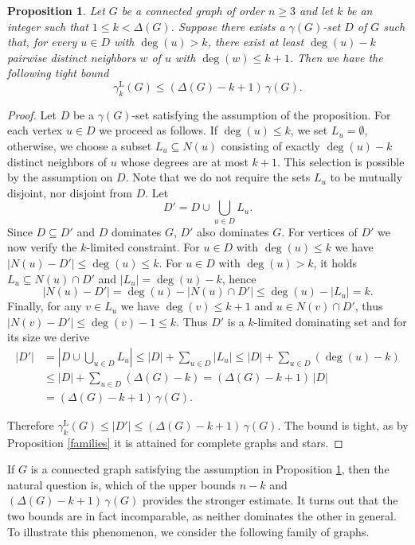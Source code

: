 \documentclass[11pt]{article}
\newtheorem{proposition}[theorem]{Proposition}
\newcommand{\gammakL}{\gamma_k^{\mathrm L}}
\begin{document}
\begin{proposition}
\label{Delta-v-zg}
Let $G$ be a connected graph of order $n\geq 3$ and let $k$ be an integer such that $1 \le k < \Delta(G)$. 
Suppose there exists a $\gamma(G)$-set $D$ of $G$ such that, for every $u\in D$ with $\deg(u)>k$, 
there exist at least $\deg(u)-k$ pairwise distinct neighbors $w$ of $u$ with $\deg(w)\le k+1$. Then we have the following tight bound 
$$
\gammakL(G) \leq (\Delta(G)-k+1)\,\gamma (G).
$$
\end{proposition}

\begin{proof} 
Let $D$ be a $\gamma(G)$-set satisfying the assumption of the proposition.
For each vertex $u\in D$ we proceed as follows. If $\deg(u)\le k$, we set $L_u=\emptyset$,
otherwise, we choose a subset $L_u\subseteq N(u)$ consisting of exactly $\deg(u)-k$ distinct neighbors of $u$ whose degrees are at most $k+1$. 
This selection is possible by the assumption on $D$. Note that we do not require the sets $L_u$ to be mutually  disjoint, nor disjoint from $D$.
Let $$D' = D \cup \bigcup_{u\in D} L_u.$$
Since $D\subseteq D'$ and $D$ dominates $G$, $D'$ also dominates $G$. For vertices of $D'$ we now verify the $k$-limited constraint. 
For $u\in D$ with $\deg(u)\le k$ we have $|N(u)-D'|\leq \deg(u)\le k$.
For $u\in D$ with $\deg(u)>k$, it holds $L_u\subseteq N(u)\cap D'$ and $|L_u|=\deg(u)-k$, hence
$$|N(u)-D'|=\deg(u)-|N(u)\cap D'|\leq \deg(u)-|L_u|=k.$$
Finally, for any $v\in L_u$ we have $\deg(v)\le k+1$ and $u\in N(v)\cap D'$, thus
$|N(v)-D'|\leq \deg(v)-1\leq k$.
Thus $D'$ is a $k$-limited dominating set and for its size we derive
\begin{align*}
|D'| & =|D \cup \bigcup_{u\in D} L_u|
\leq  |D| + \sum_{u\in D}|L_u|\leq |D| + \sum_{u\in D} (\deg(u)-k) \\
& \le |D| + \sum_{u\in D} (\Delta(G)-k)
= (\Delta(G)-k+1)\,|D| \\
& = (\Delta(G)-k+1)\,\gamma(G).
\end{align*}

\noindent Therefore $\gammakL(G)\le |D'|\le (\Delta(G)-k+1)\,\gamma(G)$.
The bound is tight, as by Proposition \ref{families} it is attained for complete graphs and stars. 
\end{proof}


If $G$ is a connected graph satisfying the assumption in Proposition \ref{Delta-v-zg}, then the natural question is, which of the upper bounds $n-k$ and $(\Delta(G)-k+1)\,\gamma(G)$ provides the stronger estimate. It turns out that the two bounds are in fact incomparable, as neither dominates the other in general. To illustrate this phenomenon, we consider the following family of graphs.
\end{document}
